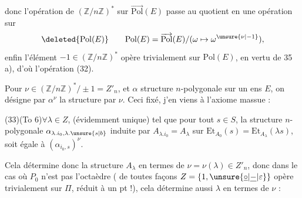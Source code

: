 
donc l'opération de $(\mathbb Z/n\mathbb Z)^*$ sur $\overrightarrow{\mathrm{Pol}}(E)$ passe au quotient en une opération sur
\[
\deleted{\mathrm{Pol}(E)}\qquad\mathrm{Pol}(E)=\overrightarrow{\mathrm{Pol}}(E)/(\omega\mapsto\omega^{\unsure{\nu|-1}}),
\]
enfin l'élément $-1\in(\mathbb Z/n\mathbb Z)^*$ opère trivialement sur $\mathrm{Pol}(E)$, en vertu de 35 a), d'où l'opération (32).

Pour $\nu\in(\mathbb Z/n\mathbb Z)^*/\pm1=Z'_n$, et $\alpha$ structure $n$-polygonale sur un ens $E$, on désigne par $\alpha^\nu$ la structure  par $\nu$. Ceci fixé, j'en viens à l'axiome massue :


(33)\qquad (To 6)\qquad $\forall\lambda\in Z$,   (évidemment unique) tel que pour tout $s\in S$, la structure $n$-polygonale  $\alpha_{\lambda.i_0,\lambda.\unsure{s|b}}$ induite par $A_{\lambda.i_0}=A_\lambda$ sur $\mathrm{Et}_{A_0}(s)=\mathrm{Et}_{A_\lambda}(\lambda s)$, soit égale à $(\alpha_{i_0,s})^\nu$.

Cela détermine donc la structure $A_\lambda$ en termes de $\nu=\nu(\lambda)\in Z'_n$,  donc dans le cas où $P_0$ n'est pas l'octaèdre ( de toutes façons $Z=\{1,\unsure{\underline{\circ}|\underline{-}|\varepsilon}\}$ opère trivialement sur $\Pi$, réduit à un pt !), cela détermine aussi $\lambda$ en termes de $\nu$ :

